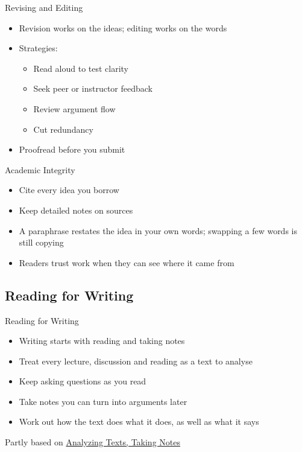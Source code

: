 \documentclass[aspectratio=169]{beamer}
\begin{document}
\begin{frame}{Revising and Editing}
\begin{itemize}
  \item Revision works on the ideas; editing works on the words
  \item Strategies:
    \begin{itemize}
      \item Read aloud to test clarity
      \item Seek peer or instructor feedback
      \item Review argument flow
      \item Cut redundancy
    \end{itemize}
  \item Proofread before you submit
\end{itemize}
\end{frame}


\begin{frame}{Academic Integrity}
\begin{itemize}
  \item Cite every idea you borrow
  \item Keep detailed notes on sources
  \item A paraphrase restates the idea in your own words; swapping a few words is still copying
  \item Readers trust work when they can see where it came from
\end{itemize}
\end{frame}



\subsection{Reading for Writing}
\begin{frame}{Reading for Writing}
\begin{itemize}
  \item Writing starts with reading and taking notes
  \item Treat every lecture, discussion and reading as a text to analyse
  \item Keep asking questions as you read
  \item Take notes you can turn into arguments later
  \item Work out how the text does what it does, as well as what it says
  \end{itemize}

\vfill
Partly based on \href{https://mlpp.pressbooks.pub/writinghandbook/chapter/chapter-1/}{Analyzing Texts, Taking Notes} \citep[Ch.~1]{writinghandbook}

\end{frame}
\end{document}

